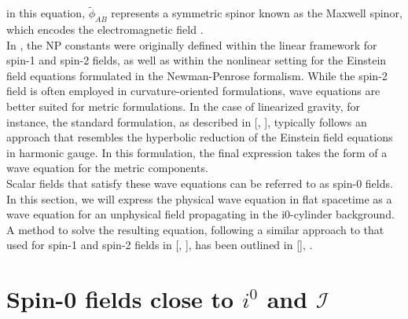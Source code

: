 in this equation, $\tilde{\phi}_{A B}$ represents a symmetric spinor known as the Maxwell spinor, which encodes the electromagnetic field \cite{GasPin23}.\\
In \cite{NewPen68}, the NP constants were originally defined within the linear framework for spin-1 and spin-2 fields, as well as within the nonlinear setting for the Einstein field equations formulated in the Newman-Penrose formalism.
While the spin-2 field is often employed in curvature-oriented formulations, wave equations are better suited for metric formulations. In the case of linearized gravity, for instance, the standard formulation, as described in [\cite{Mag07a}, \cite{Wal84a}], typically follows an approach that resembles the hyperbolic reduction of the Einstein field equations in harmonic gauge. In this formulation, the final expression takes the form of a wave equation for the metric components.\\
Scalar fields that satisfy these wave equations can be referred to as spin-0 fields. In this section, we will express the physical wave equation in flat spacetime as a wave equation for an unphysical field propagating in the i0-cylinder background. A method to solve the resulting equation, following a similar approach to that used for spin-1 and spin-2 fields in [\cite{Val07}, \cite{GasKro16d}], has been outlined in [\cite{MinMacKro22}], \cite{GasPin23}.
\section{Spin-0 fields close to $i^0$ and $\mathscr{I}$}
\label{sec:Spin0FieldsCloseToI0AndI}


